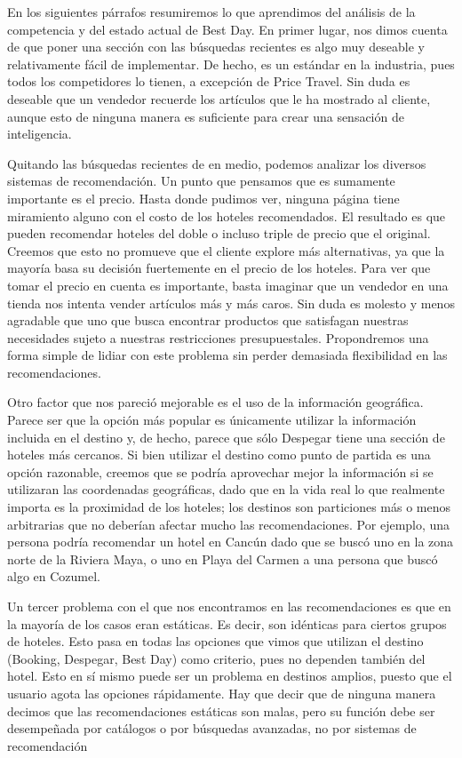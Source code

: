 \documentclass[12pt]{report}
\begin{document}
En los siguientes párrafos resumiremos lo que aprendimos del análisis de la competencia y del estado actual de Best Day. En primer lugar, nos dimos cuenta de que poner una sección con las búsquedas recientes es algo muy deseable y relativamente fácil de implementar. De hecho, es un estándar en la industria, pues todos los competidores lo tienen, a excepción de Price Travel. Sin duda es deseable que un vendedor recuerde los artículos que le ha mostrado al cliente, aunque esto de ninguna manera es suficiente para crear una sensación de inteligencia.

Quitando las búsquedas recientes de en medio, podemos analizar los diversos sistemas de recomendación. Un punto que pensamos que es sumamente importante es el precio. Hasta donde pudimos ver, ninguna página tiene miramiento alguno con el costo de los hoteles recomendados. El resultado es que pueden recomendar hoteles del doble o incluso triple de precio que el original. Creemos que esto no promueve que el cliente explore más alternativas, ya que la mayoría basa su decisión fuertemente en el precio de los hoteles. Para ver que tomar el precio en cuenta es importante, basta imaginar que un vendedor en una tienda nos intenta vender artículos más y más caros. Sin duda es molesto y menos agradable que uno que busca encontrar productos que satisfagan nuestras necesidades sujeto a nuestras restricciones presupuestales. Propondremos una forma simple de lidiar con este problema sin perder demasiada flexibilidad en las recomendaciones.

Otro factor que nos pareció mejorable es el uso de la información geográfica. Parece ser que la opción más popular es únicamente utilizar la información incluida en el destino y, de hecho, parece que sólo Despegar tiene una sección de hoteles más cercanos. Si bien utilizar el destino como punto de partida es una opción razonable, creemos que se podría aprovechar mejor la información si se utilizaran las coordenadas geográficas, dado que en la vida real lo que realmente importa es la proximidad de los hoteles; los destinos son particiones más o menos arbitrarias que no deberían afectar mucho las recomendaciones. Por ejemplo, una persona podría recomendar un hotel en Cancún dado que se buscó uno en la zona norte de la Riviera Maya, o uno en Playa del Carmen a una persona que buscó algo en Cozumel.

Un tercer problema con el que nos encontramos en las recomendaciones es que en la mayoría de los casos eran estáticas. Es decir, son idénticas para ciertos grupos de hoteles. Esto pasa en todas las opciones que vimos que utilizan el destino (Booking, Despegar, Best Day) como criterio, pues no dependen también del hotel. Esto en sí mismo puede ser un problema en destinos amplios, puesto que el usuario agota las opciones rápidamente. Hay que decir que de ninguna manera decimos que las recomendaciones estáticas son malas, pero su función debe ser desempeñada por catálogos o por búsquedas avanzadas, no por sistemas de recomendación
\end{document}
